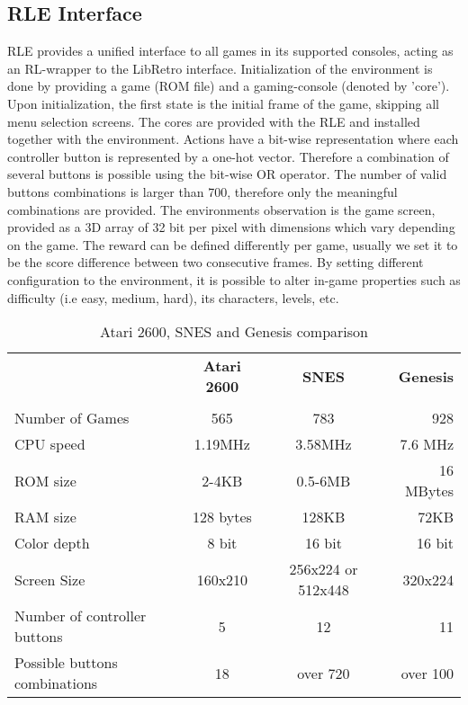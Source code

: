 \documentclass{article}
\begin{document}
\subsection{RLE Interface}
RLE provides a unified interface to all games in its supported consoles, acting as an RL-wrapper to the LibRetro interface.
Initialization of the environment is done by providing a game (ROM file) and a gaming-console (denoted by 'core'). Upon initialization, the first state is the initial frame of the game, skipping all menu selection screens. The cores are provided with the RLE and installed together with the environment.
Actions have a bit-wise representation where each controller button is represented by a one-hot vector. Therefore a combination of several buttons is possible using the bit-wise OR operator. The number of valid buttons combinations is larger than 700, therefore only the meaningful combinations are provided.
The environments observation is the game screen, provided as a 3D array of 32 bit per pixel with dimensions which vary depending on the game.
The reward can be defined differently per game, usually we set it to be the score difference between two consecutive frames.
By setting different configuration to the environment, it is possible to alter in-game properties such as difficulty (i.e easy, medium, hard), its characters, levels, etc.

\begin{table}[h!]
\centering{}
\caption{Atari 2600, SNES and Genesis comparison}
\label{table:atariSnes}
\begin{tabular}{lccr}
\hline
 &\textbf{Atari 2600} &\textbf{SNES}&\textbf{Genesis}   \\ \tabularnewline
 \hline
 \hline
Number of Games &565 &783 &928  \\ 
\hline
CPU speed &1.19MHz  &3.58MHz &7.6 MHz   \\  \hline
ROM size &2-4KB  &0.5-6MB  &16 MBytes   \\  \hline
RAM size &128 bytes  &128KB  &72KB    \\ 
 \hline
Color depth &8 bit  &16 bit &16 bit  \\  \hline
Screen Size &160x210  &256x224 or 512x448 &320x224   \\  \hline
Number of controller buttons &5  &12 &11  \\  \hline
Possible buttons combinations &18  &over 720  &over 100   \\  \hline
\end{tabular}
\end{table}
\end{document}
